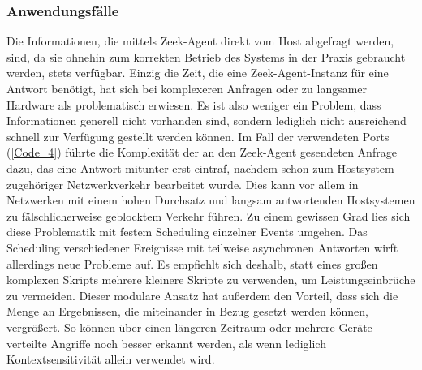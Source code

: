 \subsubsection{Anwendungsfälle}
Die Informationen, die mittels Zeek-Agent direkt vom Host abgefragt werden, sind, da sie ohnehin zum korrekten Betrieb des Systems in der Praxis gebraucht werden, stets verfügbar. Einzig die Zeit, die eine Zeek-Agent-Instanz für eine Antwort benötigt, hat sich bei komplexeren Anfragen oder zu langsamer Hardware als problematisch erwiesen. Es ist also weniger ein Problem, dass Informationen generell nicht vorhanden sind, sondern lediglich nicht ausreichend schnell zur Verfügung gestellt werden können. Im Fall der verwendeten Ports (\ref{Code_4}) führte die Komplexität der an den Zeek-Agent gesendeten Anfrage dazu, das eine Antwort mitunter erst eintraf, nachdem schon zum Hostsystem zugehöriger Netzwerkverkehr bearbeitet wurde. Dies kann vor allem in Netzwerken mit einem hohen Durchsatz und langsam antwortenden Hostsystemen zu fälschlicherweise geblocktem Verkehr führen. Zu einem gewissen Grad lies sich diese Problematik mit festem Scheduling einzelner Events umgehen. Das Scheduling verschiedener Ereignisse mit teilweise asynchronen Antworten wirft allerdings neue Probleme auf. Es empfiehlt sich deshalb, statt eines großen komplexen Skripts mehrere kleinere Skripte zu verwenden, um Leistungseinbrüche zu vermeiden. Dieser modulare Ansatz hat außerdem den Vorteil, dass sich die Menge an Ergebnissen, die miteinander in Bezug gesetzt werden können, vergrößert. So können über einen längeren Zeitraum oder mehrere Geräte verteilte Angriffe noch besser erkannt werden, als wenn lediglich Kontextsensitivität allein verwendet wird.

